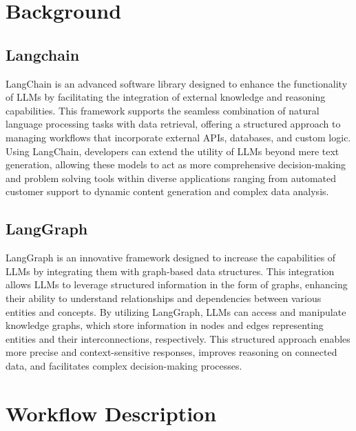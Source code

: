 \begin{bibunit}
\section{Background}
\label{sec:background}


\subsection{Langchain}

LangChain \cite{langchainai2023github} is an advanced software library designed to enhance the functionality of LLMs by facilitating the integration of external knowledge and reasoning capabilities. This framework supports the seamless combination of natural language processing tasks with data retrieval, offering a structured approach to managing workflows that incorporate external APIs, databases, and custom logic. Using LangChain, developers can extend the utility of LLMs beyond mere text generation, allowing these models to act as more comprehensive decision-making and problem solving tools within diverse applications ranging from automated customer support to dynamic content generation and complex data analysis.

\subsection{LangGraph}

LangGraph \cite{langchainailanggraph2023} is an innovative framework designed to increase the capabilities of LLMs by integrating them with graph-based data structures. This integration allows LLMs to leverage structured information in the form of graphs, enhancing their ability to understand relationships and dependencies between various entities and concepts. By utilizing LangGraph, LLMs can access and manipulate knowledge graphs, which store information in nodes and edges representing entities and their interconnections, respectively. This structured approach enables more precise and context-sensitive responses, improves reasoning on connected data, and facilitates complex decision-making processes.



\section{Workflow Description}


\end{bibunit}
